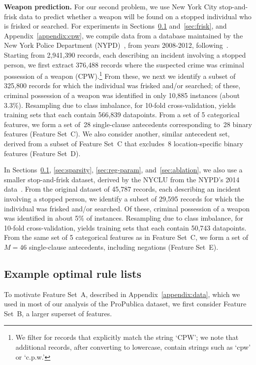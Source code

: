 \textbf{Weapon prediction.} For our second problem, we use New York City
stop-and-frisk data to predict whether a weapon will be found on a stopped
individual who is frisked or searched.
%
For experiments in Sections~\ref{sec:examples} and~\ref{sec:frisk}, and Appendix~\ref{appendix:cpw},
we compile data from a database maintained by the New York Police Department (NYPD)~\citep{nypd},
from years 2008-2012, following~\citet{Goel16}.
%
Starting from 2,941,390 records, each describing an incident involving
a stopped person, we first extract 376,488 records where the suspected
crime was criminal possession of a weapon (CPW).\footnote{We filter for records that
explicitly match the string `CPW'; we note that additional records, after converting to
lowercase, contain strings such as `cpw' or `c.p.w.'}
%
From these, we next we identify a subset of 325,800 records for which the
individual was frisked and/or searched; of these, criminal possession of a weapon
was identified in only 10,885 instances (about 3.3\%).
%
Resampling due to class imbalance, for 10-fold cross-validation, yields training sets
that each contain 566,839 datapoints.
%
From a set of 5 categorical features, we form a set of~28 single-clause antecedents
corresponding to~28 binary features (Feature Set~C).
%
We also consider another, similar antecedent set, derived from a subset of Feature Set~C
that excludes~8 location-specific binary features (Feature Set~D).

In Sections~\ref{sec:examples}, \ref{sec:sparsity}, \ref{sec:reg-param}, and~\ref{sec:ablation},
we also use a smaller stop-and-frisk dataset,
derived by the NYCLU from the NYPD's 2014 data~\citep{nyclu:2014}.
%
From the original dataset of 45,787 records, each describing an incident involving
a stopped person, we identify a subset of 29,595 records for which the individual
was frisked and/or searched.
%
Of these, criminal possession of a weapon was identified in about 5\% of instances.
%
Resampling due to class imbalance, for 10-fold cross-validation, yields training sets
that each contain 50,743 datapoints.
%
From the same set of 5 categorical features as in Feature Set~C, we form a set of ${M=46}$
single-clause antecedents, including negations (Feature Set~E).

\subsection{Example optimal rule lists}
\label{sec:examples}

To motivate Feature Set~A, described in Appendix~\ref{appendix:data},
which we used in most of our analysis of the ProPublica dataset,
we first consider Feature Set~B, a larger superset of features.


